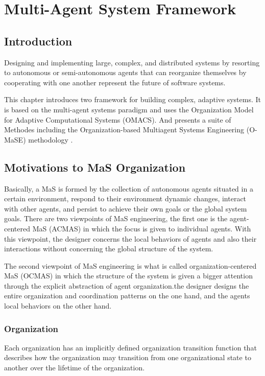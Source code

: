 
\chapter{\label{cha:org}Multi-Agent System Framework}


\section{Introduction}
Designing and implementing large, complex, and distributed systems by resorting to autonomous 
or semi-autonomous agents that can reorganize themselves by cooperating with one another 
represent the future of software systems\cite{omacs0}. 

This chapter introduces two framework for building complex, adaptive systems. 
It is based on the multi-agent systems paradigm and uses the Organization Model for Adaptive 
Computational Systems (OMACS). 
And presents a suite of Methodes including the Organization-based Multiagent Systems Engineering 
(O-MaSE) methodology \cite{omacs4}.


\section{Motivations to MaS Organization}
 
Basically, a MaS is formed by the collection of autonomous agents situated in a certain environment, respond
to their environment dynamic changes, interact with other agents, and persist to achieve their own goals or the global
system goals. There are two viewpoints of MaS engineering, the first one is the agent-centered MaS (ACMAS) in which
the focus is given to individual agents. With this viewpoint, the designer concerns the local behaviors of agents and also
their interactions without concerning the global structure of the system\cite{omacs3}.

The second viewpoint of MaS engineering is what is called
organization-centered MaS (OCMAS) in which the structure
of the system is given a bigger attention through the explicit
abstraction of agent organization\cite{omacs3}.the
designer designs the entire organization and coordination
patterns on the one hand, and the agents local behaviors on
the other hand.

\subsection{Organization}
Each organization has an implicitly defined organization transition function 
that describes how the organization may transition from one organizational state 
to another over the lifetime of the organization\cite{omacs2}.
	
